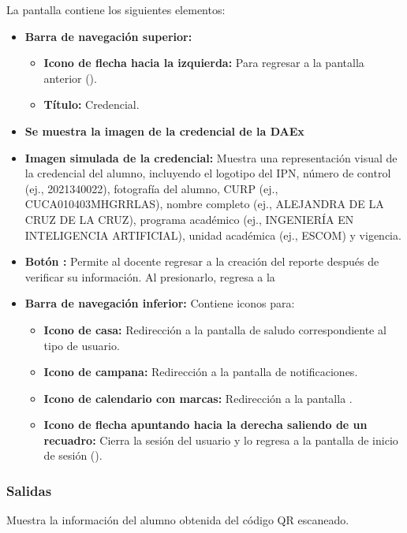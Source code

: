 La pantalla contiene los siguientes elementos:
\begin{itemize}
	\item \textbf{Barra de navegación superior:}
	\begin{itemize}
		\item \textbf{Icono de flecha hacia la izquierda:} Para regresar a la pantalla anterior ().
		\item \textbf{Título:} Credencial.
	\end{itemize}
	\item \textbf{Se muestra la imagen de la credencial de la DAEx}
	\item \textbf{Imagen simulada de la credencial:} Muestra una representación visual de la credencial del alumno, incluyendo el logotipo del IPN, número de control (ej., 2021340022), fotografía del alumno, CURP (ej., CUCA010403MHGRRLAS), nombre completo (ej., ALEJANDRA DE LA CRUZ DE LA CRUZ), programa académico (ej., INGENIERÍA EN INTELIGENCIA ARTIFICIAL), unidad académica (ej., ESCOM) y vigencia.
	\item \textbf{Botón :} Permite al docente regresar a la creación del reporte después de verificar su información. Al presionarlo, regresa a la 
	\item \textbf{Barra de navegación inferior:} Contiene iconos para:
	\begin{itemize}
		\item \textbf{Icono de casa:} Redirección a la pantalla de saludo correspondiente al tipo de usuario.
		\item \textbf{Icono de campana:} Redirección a la pantalla de notificaciones.
		\item \textbf{Icono de calendario con marcas:} Redirección a la pantalla .
		\item \textbf{Icono de flecha apuntando hacia la derecha saliendo de un recuadro:} Cierra la sesión del usuario y lo regresa a la pantalla de inicio de sesión ().
	\end{itemize}
\end{itemize}

\subsubsection{Salidas}
Muestra la información del alumno obtenida del código QR escaneado.

